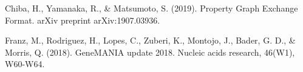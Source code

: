 \documentclass[runningheads]{llncs}
\begin{document}
\begin{thebibliography}{8}
Chiba, H., Yamanaka, R., & Matsumoto, S. (2019). Property Graph Exchange Format. arXiv preprint arXiv:1907.03936.

Franz, M., Rodriguez, H., Lopes, C., Zuberi, K., Montojo, J., Bader, G. D., & Morris, Q. (2018). GeneMANIA update 2018. Nucleic acids research, 46(W1), W60-W64.





\end{thebibliography}
\end{document}
